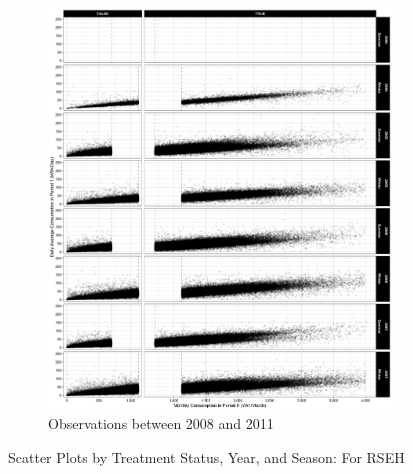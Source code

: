 \begin{figure}
\begin{subfigure}{1.0\textwidth}
        \includegraphics[scale = 0.12]{02_Plots/SMUD-Billing-Data_RD-Design_Scatter_Absolute-Consumption-in-H-Axis_RSEH_2004-2007}
        \caption{Observations between 2008 and 2011}  
    \end{subfigure}
    \caption{Scatter Plots by Treatment Status, Year, and Season: For RSEH}
    \label{Figure:Scatter-Plots_RSEH}
\end{figure}

